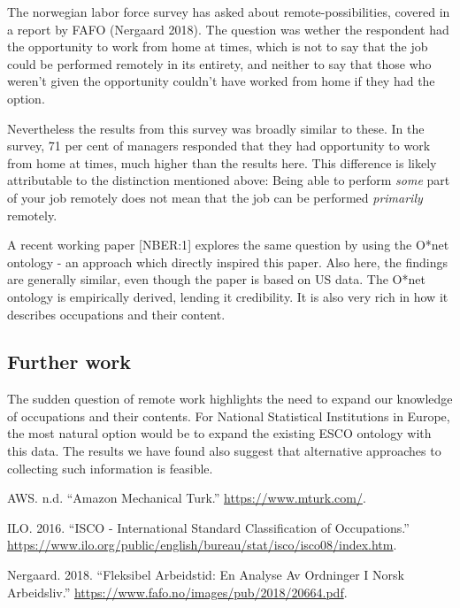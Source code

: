 \documentclass[11pt,]{article}
\begin{document}
The norwegian labor force survey has asked about remote-possibilities,
covered in a report by FAFO (Nergaard 2018). The question was wether the
respondent had the opportunity to work from home at times, which is not
to say that the job could be performed remotely in its entirety, and
neither to say that those who weren't given the opportunity couldn't
have worked from home if they had the option.

Nevertheless the results from this survey was broadly similar to these.
In the survey, 71 per cent of managers responded that they had
opportunity to work from home at times, much higher than the results
here. This difference is likely attributable to the distinction
mentioned above: Being able to perform \emph{some} part of your job
remotely does not mean that the job can be performed \emph{primarily}
remotely.

A recent working paper {[}NBER:1{]} explores the same question by using
the O*net ontology - an approach which directly inspired this paper.
Also here, the findings are generally similar, even though the paper is
based on US data. The O*net ontology is empirically derived, lending it
credibility. It is also very rich in how it describes occupations and
their content.

\hypertarget{further-work}{%
\subsection{Further work}\label{further-work}}

The sudden question of remote work highlights the need to expand our
knowledge of occupations and their contents. For National Statistical
Institutions in Europe, the most natural option would be to expand the
existing ESCO ontology with this data. The results we have found also
suggest that alternative approaches to collecting such information is
feasible.

\hypertarget{refs}{}
\leavevmode\hypertarget{ref-MT}{}%
AWS. n.d. ``Amazon Mechanical Turk.'' \url{https://www.mturk.com/}.

\leavevmode\hypertarget{ref-ISCO:08}{}%
ILO. 2016. ``ISCO - International Standard Classification of
Occupations.''
\url{https://www.ilo.org/public/english/bureau/stat/isco/isco08/index.htm}.

\leavevmode\hypertarget{ref-FAFO:HK}{}%
Nergaard. 2018. ``Fleksibel Arbeidstid: En Analyse Av Ordninger I Norsk
Arbeidsliv.'' \url{https://www.fafo.no/images/pub/2018/20664.pdf}.

\newpage
\singlespacing 
\end{document}
